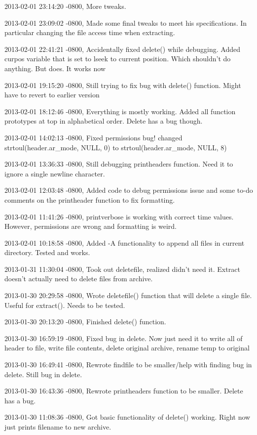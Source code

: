 \documentclass[letterpaper,10pt,titlepage]{article}
\begin{document}
\begin{enumerate}
2013-02-01 23:14:20 -0800, More tweaks.

2013-02-01 23:09:02 -0800, Made some final tweaks to meet his specifications. In particular changing the file access time when extracting.

2013-02-01 22:41:21 -0800, Accidentally fixed delete() while debugging. Added curpos variable that is set to lseek to current position. Which shouldn't do anything. But does. It works now

2013-02-01 19:15:20 -0800, Still trying to fix bug with delete() function. Might have to revert to earlier version

2013-02-01 18:12:46 -0800, Everything is mostly working. Added all function prototypes at top in alphabetical order. Delete has a bug though.

2013-02-01 14:02:13 -0800, Fixed permissions bug! changed strtoul(header.ar\_mode, NULL, 0) to strtoul(header.ar\_mode, NULL, 8)

2013-02-01 13:36:33 -0800, Still debugging printheaders function. Need it to ignore a single newline character.

2013-02-01 12:03:48 -0800, Added code to debug permissions issue and some to-do comments on the printheader function to fix formatting.

2013-02-01 11:41:26 -0800, printverbose is working with correct time values. However, permissions are wrong and formatting is weird.

2013-02-01 10:18:58 -0800, Added -A functionality to append all files in current directory. Tested and works.

2013-01-31 11:30:04 -0800, Took out deletefile, realized didn't need it. Extract doesn't actually need to delete files from archive.

2013-01-30 20:29:58 -0800, Wrote deletefile() function that will delete a single file. Useful for extract(). Needs to be tested.

2013-01-30 20:13:20 -0800, Finished delete() function.

2013-01-30 16:59:19 -0800, Fixed bug in delete. Now just need it to write all of header to file, write file contents, delete original archive, rename temp to original

2013-01-30 16:49:41 -0800, Rewrote findfile to be smaller/help with finding bug in delete. Still bug in delete.

2013-01-30 16:43:36 -0800, Rewrote printheaders function to be smaller. Delete has a bug.

2013-01-30 11:08:36 -0800, Got basic functionality of delete() working. Right now just prints filename to new archive.


\end{enumerate}
\end{document}
